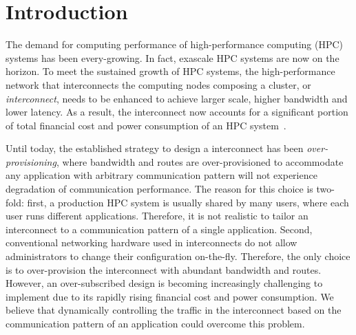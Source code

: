 \documentclass[graybox]{svmult}
\begin{document}

\section{Introduction}

The demand for computing performance of high-performance computing (HPC)
systems has been every-growing. In fact, exascale HPC systems are now on the
horizon. To meet the sustained growth of HPC systems, the high-performance
network that interconnects the computing nodes composing a cluster, or
\textit{interconnect}, needs to be enhanced to achieve larger scale, higher
bandwidth and lower latency. As a result, the interconnect now accounts for a
significant portion of total financial cost and power consumption of an HPC
system~\cite{Michelogiannakis2017}.

Until today, the established strategy to design a interconnect has been
\textit{over-provisioning}, where bandwidth and routes are over-provisioned to
accommodate any application with arbitrary communication pattern will not
experience degradation of communication performance. The reason for this
choice is two-fold: first, a production HPC system is usually shared by many
users, where each user runs different applications. Therefore, it is not
realistic to tailor an interconnect to a communication pattern of a single
application. Second, conventional networking hardware used in interconnects do
not allow administrators to change their configuration on-the-fly. Therefore,
the only choice is to over-provision the interconnect with abundant bandwidth
and routes. However, an over-subscribed design is becoming increasingly
challenging to implement due to its rapidly rising financial cost and power
consumption. We believe that dynamically controlling the traffic in the
interconnect based on the communication pattern of an application could
overcome this problem.
\end{document}
